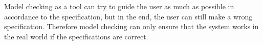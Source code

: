 Model checking as a tool can try to guide the user as much as possible in accordance to the specification, but in the end, the user can still make a wrong specification. Therefore model checking can only ensure that the system works in the real world if the specifications are correct.





